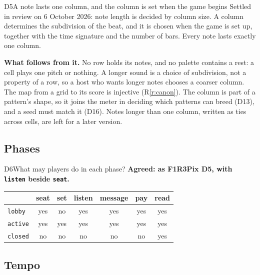 \documentclass[11pt,a4paper]{article}
\newcommand{\code}[1]{\texttt{#1}}
\begin{document}
\begin{settled}{D5}{A note lasts one column, and the column is set when the game begins}
Settled in review on 6 October 2026: note length is decided by column size. A column
determines the subdivision of the beat, and it is chosen when the game is set up, together with
the time signature and the number of bars. Every note lasts exactly one column.

\textbf{What follows from it.} No row holds its notes, and no palette contains a rest: a cell
plays one pitch or nothing. A longer sound is a choice of subdivision, not a property of a
row, so a host who wants longer notes chooses a coarser column. The map from a grid to its
score is injective (R\ref{r:canon}). The column is part of a pattern's shape, so it joins the
meter in deciding which patterns can breed (D13), and a seed must match it (D16). Notes longer
than one column, written as ties across cells, are left for a later version.
\end{settled}

\subsection{Phases}

\begin{decision}{D6}{What may players do in each phase?}
\textbf{Agreed: as F1R3Pix D5, with \code{listen} beside \code{seat}.}

\begin{tabular}{@{}lcccccc@{}}
\toprule
 & seat & set & listen & message & pay & read \\
\midrule
\code{lobby}  & yes & no  & yes & yes & yes & yes\\
\code{active} & yes & yes & yes & yes & yes & yes\\
\code{closed} & no  & no  & no  & no  & no  & yes\\
\bottomrule
\end{tabular}
\end{decision}

\subsection{Tempo}
\end{document}
